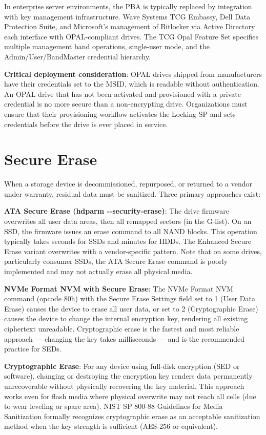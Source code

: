 In enterprise server environments, the PBA is typically replaced by integration with key management infrastructure. Wave Systems TCG Embassy, Dell Data Protection Suite, and Microsoft's management of Bitlocker via Active Directory each interface with OPAL-compliant drives. The TCG Opal Feature Set specifies multiple management band operations, single-user mode, and the Admin/User/BandMaster credential hierarchy.

\textbf{Critical deployment consideration}: OPAL drives shipped from manufacturers have their credentials set to the MSID, which is readable without authentication. An OPAL drive that has not been activated and provisioned with a private credential is no more secure than a non-encrypting drive. Organizations must ensure that their provisioning workflow activates the Locking SP and sets credentials before the drive is ever placed in service.

\section{Secure Erase}
When a storage device is decommissioned, repurposed, or returned to a vendor under warranty, residual data must be sanitized. Three primary approaches exist:

\textbf{ATA Secure Erase (hdparm -\/-security-erase)}: The drive firmware overwrites all user data areas, then all remapped sectors (in the G-list). On an SSD, the firmware issues an erase command to all NAND blocks. This operation typically takes seconds for SSDs and minutes for HDDs. The Enhanced Secure Erase variant overwrites with a vendor-specific pattern. Note that on some drives, particularly consumer SSDs, the ATA Secure Erase command is poorly implemented and may not actually erase all physical media.

\textbf{NVMe Format NVM with Secure Erase}: The NVMe Format NVM command (opcode 80h) with the Secure Erase Settings field set to 1 (User Data Erase) causes the device to erase all user data, or set to 2 (Cryptographic Erase) causes the device to change the internal encryption key, rendering all existing ciphertext unreadable. Cryptographic erase is the fastest and most reliable approach --- changing the key takes milliseconds --- and is the recommended practice for SEDs.

\textbf{Cryptographic Erase}: For any device using full-disk encryption (SED or software), changing or destroying the encryption key renders data permanently unrecoverable without physically recovering the key material. This approach works even for flash media where physical overwrite may not reach all cells (due to wear leveling or spare area). NIST SP 800-88 Guidelines for Media Sanitization formally recognizes cryptographic erase as an acceptable sanitization method when the key strength is sufficient (AES-256 or equivalent).

